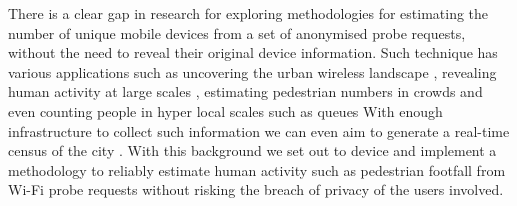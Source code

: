 There is a clear gap in research for exploring methodologies for estimating the number of unique mobile devices from a set of anonymised probe requests, without the need to reveal their original device information.
Such technique has various applications such as uncovering the urban wireless landscape \citep{rose2010mapping}, revealing human activity at large scales \citep{qin2013discovering}, estimating pedestrian numbers in crowds \citep{schauer2014estimating,fukuzaki2015statistical} and even counting people in hyper local scales such as queues \citep{wang2013measuring}
With enough infrastructure to collect such information we can even aim to generate a real-time census of the city \citep{konto2017}.
With this background we set out to device and implement a methodology to reliably estimate human activity such as pedestrian footfall from Wi-Fi probe requests without risking the breach of privacy of the users involved.
